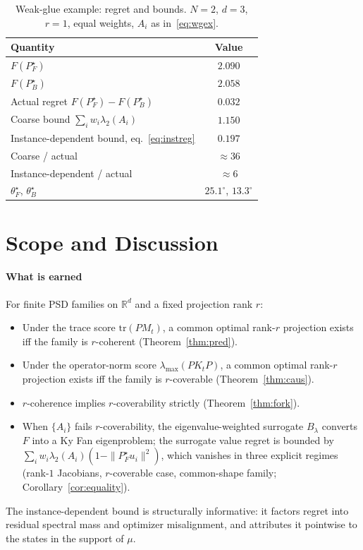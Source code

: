 \documentclass[final,3p,times]{elsarticle}
\newcommand{\tr}{\mathrm{tr}}
\newcommand{\R}{\mathbb{R}}
\begin{document}
\begin{table}[tbp]
\caption{Weak-glue example: regret and bounds.
$N=2$, $d=3$, $r=1$, equal weights, $A_i$ as in~\eqref{eq:wgex}.}
\label{tab:wg}
\begin{center}
\begin{tabular}{lc}
\toprule
Quantity & Value \\
\midrule
$F(P_F^\star)$                                & $2.090$ \\
$F(P_B^\star)$                                & $2.058$ \\
Actual regret $F(P_F^\star)-F(P_B^\star)$     & $0.032$ \\
Coarse bound $\sum_i w_i\lambda_2(A_i)$       & $1.150$ \\
Instance-dependent bound, eq.~\eqref{eq:instreg} & $0.197$ \\
Coarse / actual                               & $\approx 36$ \\
Instance-dependent / actual                   & $\approx 6$ \\
$\theta_F^\star$, $\theta_B^\star$            & $25.1^\circ$, $13.3^\circ$ \\
\bottomrule
\end{tabular}
\end{center}
\end{table}

\section{Scope and Discussion}
\label{sec:scope}

\paragraph{What is earned}
For finite PSD families on $\R^d$ and a fixed projection rank $r$:
\begin{itemize}
\item Under the trace score $\tr(PM_t)$, a common optimal rank-$r$
projection exists iff the family is $r$-coherent
(Theorem~\ref{thm:pred}).
\item Under the operator-norm score $\lambda_{\max}(PK_tP)$, a common
optimal rank-$r$ projection exists iff the family is $r$-coverable
(Theorem~\ref{thm:caus}).
\item $r$-coherence implies $r$-coverability strictly
(Theorem~\ref{thm:fork}).
\item When $\{A_i\}$ fails $r$-coverability, the eigenvalue-weighted
surrogate $B_\lambda$ converts $F$ into a Ky Fan eigenproblem; the
surrogate value regret is bounded by
$\sum_i w_i\lambda_2(A_i)(1-\|P_F^\star u_i\|^2)$, which vanishes in
three explicit regimes (rank-$1$ Jacobians, $r$-coverable case,
common-shape family; Corollary~\ref{cor:equality}).
\end{itemize}
The instance-dependent bound is structurally informative: it factors
regret into residual spectral mass and optimizer misalignment, and
attributes it pointwise to the states in the support of $\mu$.
\end{document}
